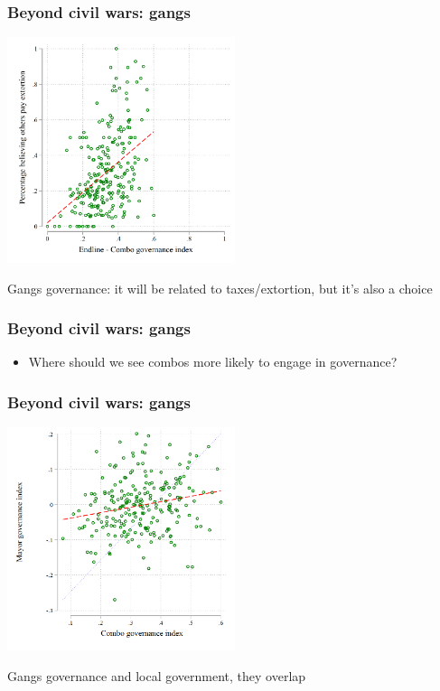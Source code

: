 \documentclass[utf8, xcolor=dvipsnames]{beamer}
\begin{document}
\begin{frame}
\frametitle{Beyond civil wars: gangs}
\centering

\includegraphics[width = 0.5\textwidth]{img/combo_gov_index_taxation}

Gangs governance: it will be related to taxes/extortion, but it's also a choice

\vspace{15pt}


\end{frame}

\begin{frame}
\frametitle{Beyond civil wars: gangs}
\centering

\begin{itemize}
  \item Where should we see combos more likely to engage in governance?
\end{itemize}

\vspace{15pt}


\end{frame}

\begin{frame}
\frametitle{Beyond civil wars: gangs}
\centering

\includegraphics[width = 0.5\textwidth]{img/combo_mayor_gov_index}

Gangs governance and local government, they overlap

\vspace{15pt}

\end{frame}
\end{document}
